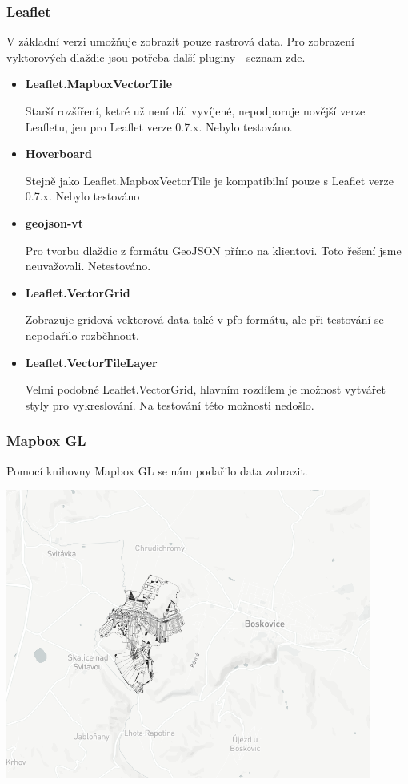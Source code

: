 \documentclass[12pt]{article}
\begin{document}
\subsubsection{Leaflet}
V základní verzi umožňuje zobrazit pouze rastrová data. Pro zobrazení vyktorových dlaždic jsou potřeba další pluginy - seznam \href{https://leafletjs.com/plugins.html#vector-tiles}{zde}.

\begin{itemize}
	\item \textbf{Leaflet.MapboxVectorTile}
	
	Starší rozšíření, ketré už není dál vyvíjené, nepodporuje novější verze Leafletu, jen pro Leaflet verze 0.7.x. Nebylo testováno.
	
	\item \textbf{Hoverboard}
	
	Stejně jako Leaflet.MapboxVectorTile je kompatibilní pouze s Leaflet verze 0.7.x. Nebylo testováno
	
	\item \textbf{geojson-vt}
	
	Pro tvorbu dlaždic z formátu GeoJSON přímo na klientovi. Toto řešení jsme neuvažovali. Netestováno.
	
	\item \textbf{Leaflet.VectorGrid}
	
	Zobrazuje gridová vektorová data také v pfb formátu, ale při testování se nepodařilo rozběhnout.
	
	\item \textbf{Leaflet.VectorTileLayer}
	
	Velmi podobné Leaflet.VectorGrid, hlavním rozdílem je možnost vytvářet styly pro vykreslování. Na testování této možnosti nedošlo.
	
\end{itemize}


\subsubsection{Mapbox GL}
Pomocí knihovny Mapbox GL se nám podařilo data zobrazit.

\begin{center}
	\includegraphics[width=12cm]{./img/mapboxGL_ukazka_dat.png}
\end{center}
\end{document}
